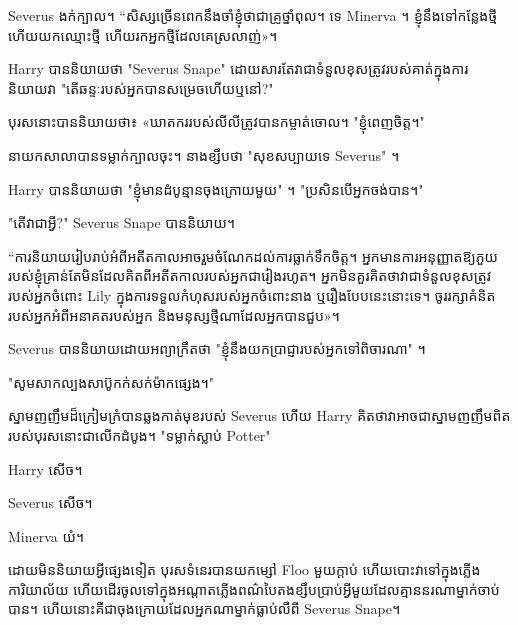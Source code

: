 Severus ងក់ក្បាល។ “សិស្ស​ច្រើន​ពេក​នឹង​ចាំ​ខ្ញុំ​ថា​ជា​គ្រូ​ថ្នាំ​ពុល។ ទេ Minerva ។ ខ្ញុំ​នឹង​ទៅ​កន្លែង​ថ្មី ហើយ​យក​ឈ្មោះ​ថ្មី ហើយ​រក​អ្នក​ថ្មី​ដែល​គេ​ស្រលាញ់»។

Harry បាននិយាយថា "Severus Snape" ដោយសារតែវាជាទំនួលខុសត្រូវរបស់គាត់ក្នុងការនិយាយវា "តើឆន្ទៈរបស់អ្នកបានសម្រេចហើយឬនៅ?"

បុរស​នោះ​បាន​និយាយ​ថា​៖ «​ឃាតករ​របស់​លីលី​ត្រូវ​បាន​កម្ចាត់​ចោល។ "ខ្ញុំពេញចិត្ត។"

នាយកសាលាបានទម្លាក់ក្បាលចុះ។ នាងខ្សឹបថា "សុខសប្បាយទេ Severus" ។

Harry បាននិយាយថា "ខ្ញុំមានដំបូន្មានចុងក្រោយមួយ" ។ "ប្រសិនបើអ្នកចង់បាន។"

"តើវាជាអ្វី?" Severus Snape បាននិយាយ។

“ការនិយាយរៀបរាប់អំពីអតីតកាលអាចរួមចំណែកដល់ការធ្លាក់ទឹកចិត្ត។ អ្នក​មាន​ការ​អនុញ្ញាត​ឱ្យ​ភួយ​របស់​ខ្ញុំ​គ្រាន់​តែ​មិន​ដែល​គិត​ពី​អតីតកាល​របស់​អ្នក​ជា​រៀង​រហូត​។ អ្នកមិនគួរគិតថាវាជាទំនួលខុសត្រូវរបស់អ្នកចំពោះ Lily ក្នុងការទទួលកំហុសរបស់អ្នកចំពោះនាង ឬរឿងបែបនេះនោះទេ។ ចូរ​រក្សា​គំនិត​របស់​អ្នក​អំពី​អនាគត​របស់​អ្នក និង​មនុស្ស​ថ្មី​ណា​ដែល​អ្នក​បាន​ជួប»។

Severus បាននិយាយដោយអព្យាក្រឹតថា "ខ្ញុំនឹងយកប្រាជ្ញារបស់អ្នកទៅពិចារណា" ។

"សូមសាកល្បងសាប៊ូកក់សក់ម៉ាកផ្សេង។"

ស្នាមញញឹមដ៏ក្រៀមក្រំបានឆ្លងកាត់មុខរបស់ Severus ហើយ Harry គិតថាវាអាចជាស្នាមញញឹមពិតរបស់បុរសនោះជាលើកដំបូង។ "ទម្លាក់​ស្លាប់ Potter"

Harry សើច។

Severus សើច។

Minerva យំ។

ដោយមិននិយាយអ្វីផ្សេងទៀត បុរសទំនេរបានយកម្សៅ Floo មួយក្តាប់ ហើយបោះវាទៅក្នុងភ្លើងការិយាល័យ ហើយដើរចូលទៅក្នុងអណ្តាតភ្លើងពណ៌បៃតងខ្សឹបប្រាប់អ្វីមួយដែលគ្មាននរណាម្នាក់ចាប់បាន។ ហើយនោះគឺជាចុងក្រោយដែលអ្នកណាម្នាក់ធ្លាប់លឺពី Severus Snape។
